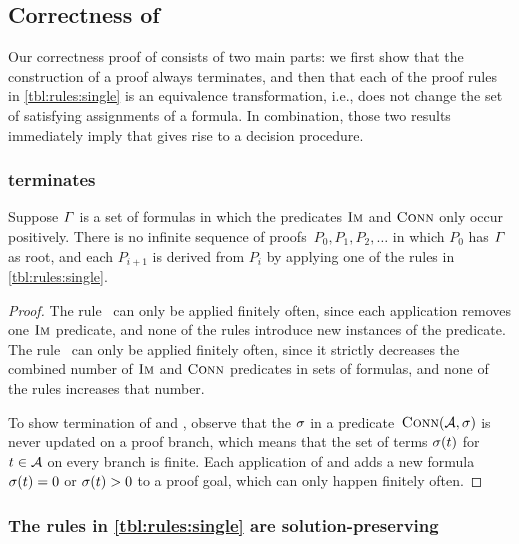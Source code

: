 \documentclass[acmsmall,review,anonymous,screen]{acmart}\settopmatter{printfolios=true,printccs=true,printacmref=true}
\theoremstyle{definition}
\begin{document}
\subsection{Correctness of \Calculus{}}\label{sec:single:correct}

Our correctness proof of \Calculus{} consists of two main parts: we
first show that the construction of a proof always terminates, and
then that each of the proof rules in \cref{tbl:rules:single} is
an equivalence transformation, i.e., does not change the set of
satisfying assignments of a formula. In combination, those two results
immediately imply that \Calculus{} gives rise to a decision procedure.

\subsubsection{\Calculus{} terminates}
\begin{lemma}\label{lma:single-terminates}
  Suppose $\varGamma{}$ is a set of formulas in which the predicates
  $\operatorname{\textsc{Im}}$ and $\operatorname{\textsc{Conn}}$ only occur positively. There is no
  infinite sequence of proofs~$P_0, P_1, P_2, \ldots$ in which $P_0$
  has $\varGamma{}$ as root, and each $P_{i+1}$ is derived from
  $P_i$ by applying one of the rules in \cref{tbl:rules:single}.
\end{lemma}

\begin{proof}
  The rule~\Expand{} can only be applied finitely often, since each
  application removes one $\operatorname{\textsc{Im}}$ predicate, and none of the rules
  introduce new instances of the predicate. The rule~\Subsume{} can
  only be applied finitely often, since it strictly decreases the
  combined number of $\operatorname{\textsc{Im}}$ and $\operatorname{\textsc{Conn}}$ predicates in sets of
  formulas, and none of the rules increases that number.

  To show termination of \Split{} and \Propagate{}, observe that the
  $\operatorname{\sigma}$ in a predicate~$\operatorname{\textsc{Conn}}(\mathcal{A}, \operatorname{\sigma})$ is never
  updated on a proof branch, which means that the set of terms
  $\operatorname{\sigma}(t)$ for $t \in \mathcal{A}$ on every branch is finite. Each
  application of \Split{} and \Propagate{} adds a new
  formula~$\operatorname{\sigma}(t) = 0$ or $\operatorname{\sigma}(t) > 0$
  to a proof goal, which can only happen finitely often.
\end{proof}

\subsubsection{The rules in \cref{tbl:rules:single} are solution-preserving}
\end{document}
